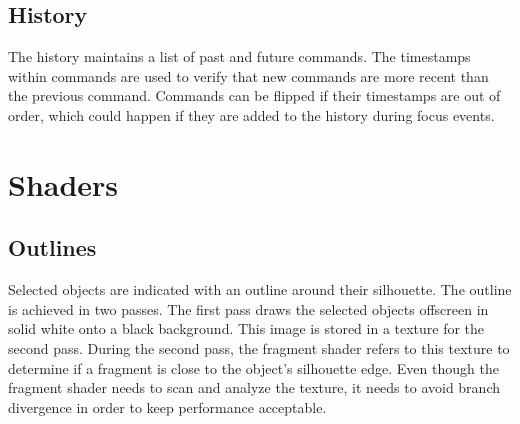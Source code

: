 \documentclass[10pt]{article}
\begin{document}
\subsection{History}
The history maintains a list of past and future commands. The timestamps within commands are used to verify that new commands are more recent than the previous command. Commands can be flipped if their timestamps are out of order, which could happen if they are added to the history during focus events.

\section{Shaders}
\subsection{Outlines}
Selected objects are indicated with an outline around their silhouette. The outline is achieved in two passes. The first pass draws the selected objects offscreen in solid white onto a black background. This image is stored in a texture for the second pass. During the second pass, the fragment shader refers to this texture to determine if a fragment is close to the object's silhouette edge. Even though the fragment shader needs to scan and analyze the texture, it needs to avoid branch divergence in order to keep performance acceptable.
\end{document}
